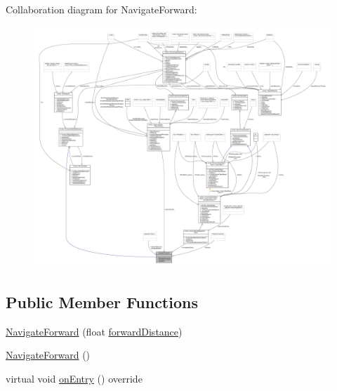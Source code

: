 Collaboration diagram for Navigate\+Forward\+:
\nopagebreak
\begin{figure}[H]
\begin{center}
\leavevmode
\includegraphics[width=350pt]{classNavigateForward__coll__graph}
\end{center}
\end{figure}
\subsection*{Public Member Functions}
\begin{DoxyCompactItemize}
\item 
\hyperlink{classNavigateForward_a45fc93000c710b0a31b34d2dd2fa3625}{Navigate\+Forward} (float \hyperlink{classNavigateForward_ad2b2157f0a2c94fd9e1f11ae22d203fc}{forward\+Distance})
\item 
\hyperlink{classNavigateForward_a49125886df55eb4253f95dc8e3e45ba3}{Navigate\+Forward} ()
\item 
virtual void \hyperlink{classNavigateForward_a2a1ad66b031773aeac11663020afebba}{on\+Entry} () override
\end{DoxyCompactItemize}
